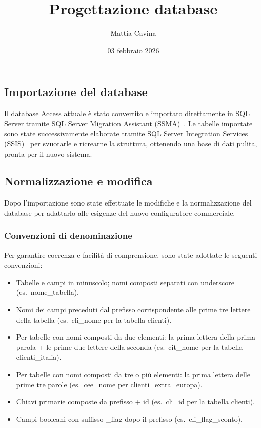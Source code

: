 \documentclass[12pt, a4paper]{article}
\title{Progettazione database}
\author{Mattia Cavina}
\date{03 febbraio 2026}
\begin{document}
\subsection{Importazione del database}

Il database Access attuale è stato convertito e importato direttamente in SQL Server tramite SQL Server Migration Assistant (SSMA)~\cite{SQLServerMigrationAssistant}.
Le tabelle importate sono state successivamente elaborate tramite SQL Server Integration Services (SSIS)~\cite{SQLServerIntegration} per svuotarle e ricrearne la struttura, ottenendo una base di dati pulita, pronta per il nuovo sistema.

\subsection{Normalizzazione e modifica}

Dopo l'importazione sono state effettuate le modifiche e la normalizzazione del database per adattarlo alle esigenze del nuovo configuratore commerciale.

\subsubsection{Convenzioni di denominazione}

Per garantire coerenza e facilità di comprensione, sono state adottate le seguenti convenzioni:

\begin{itemize}
    \item Tabelle e campi in minuscolo; nomi composti separati con underscore (es.\ nome\_tabella).
    \item Nomi dei campi preceduti dal prefisso corrispondente alle prime tre lettere della tabella (es.\ cli\_nome per la tabella clienti).
    \item Per tabelle con nomi composti da due elementi: la prima lettera della prima parola + le prime due lettere della seconda (es.\ cit\_nome per la tabella clienti\_italia).
    \item Per tabelle con nomi composti da tre o più elementi: la prima lettera delle prime tre parole (es.\ cee\_nome per clienti\_extra\_europa).
    \item Chiavi primarie composte da prefisso + id (es.\ cli\_id per la tabella clienti).
    \item Campi booleani con suffisso \_flag dopo il prefisso (es.\ cli\_flag\_sconto).
\end{itemize}
\end{document}
